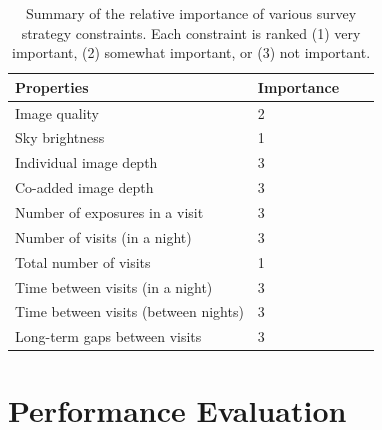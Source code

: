 \documentclass[12pt, letterpaper]{article}
\begin{document}
\begin{table}[ht]
    \centering
    \begin{tabular}{|l|l|l|l|}
        \hline
        Properties & Importance \hspace{.3in} \\
        \hline
        Image quality & 2\\
        Sky brightness & 1\\
        Individual image depth & 3\\
        Co-added image depth & 3\\
        Number of exposures in a visit & 3\\
        Number of visits (in a night) & 3\\ 
        Total number of visits & 1\\
        Time between visits (in a night) & 3\\
        Time between visits (between nights)  & 3\\
        Long-term gaps between visits & 3\\
        \hline
    \end{tabular}
    \caption{Summary of the relative importance of various survey strategy constraints. Each constraint is ranked (1) very important, (2) somewhat important, or (3) not important.}
        \label{tab:obs_constraints}
\end{table}

\section{Performance Evaluation}
\end{document}
